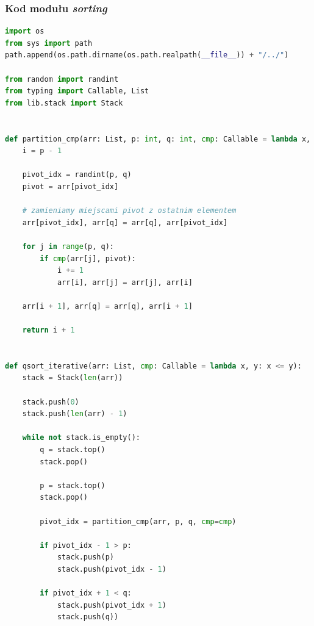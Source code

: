 \documentclass[11pt]{article}
\theoremstyle{remark} \newtheorem{definition}{def.}
\theoremstyle{definition} \newtheorem{twierdzenie}{tw.}
\begin{document}
\subsubsection*{Kod modułu \emph{sorting}}
\begin{lstlisting}[language=Python]
import os
from sys import path
path.append(os.path.dirname(os.path.realpath(__file__)) + "/../")

from random import randint
from typing import Callable, List
from lib.stack import Stack


def partition_cmp(arr: List, p: int, q: int, cmp: Callable = lambda x, y: x <= y) -> int: 
    i = p - 1
    
    pivot_idx = randint(p, q)
    pivot = arr[pivot_idx]
    
    # zamieniamy miejscami pivot z ostatnim elementem
    arr[pivot_idx], arr[q] = arr[q], arr[pivot_idx]

    for j in range(p, q):
        if cmp(arr[j], pivot):
            i += 1
            arr[i], arr[j] = arr[j], arr[i]
            
    arr[i + 1], arr[q] = arr[q], arr[i + 1]
    
    return i + 1
            
            
def qsort_iterative(arr: List, cmp: Callable = lambda x, y: x <= y):
    stack = Stack(len(arr))
    
    stack.push(0)
    stack.push(len(arr) - 1)
    
    while not stack.is_empty():
        q = stack.top()
        stack.pop()

        p = stack.top()
        stack.pop()
        
        pivot_idx = partition_cmp(arr, p, q, cmp=cmp)
        
        if pivot_idx - 1 > p:
            stack.push(p)
            stack.push(pivot_idx - 1)
            
        if pivot_idx + 1 < q:
            stack.push(pivot_idx + 1)
            stack.push(q))
\end{lstlisting}
\end{document}
